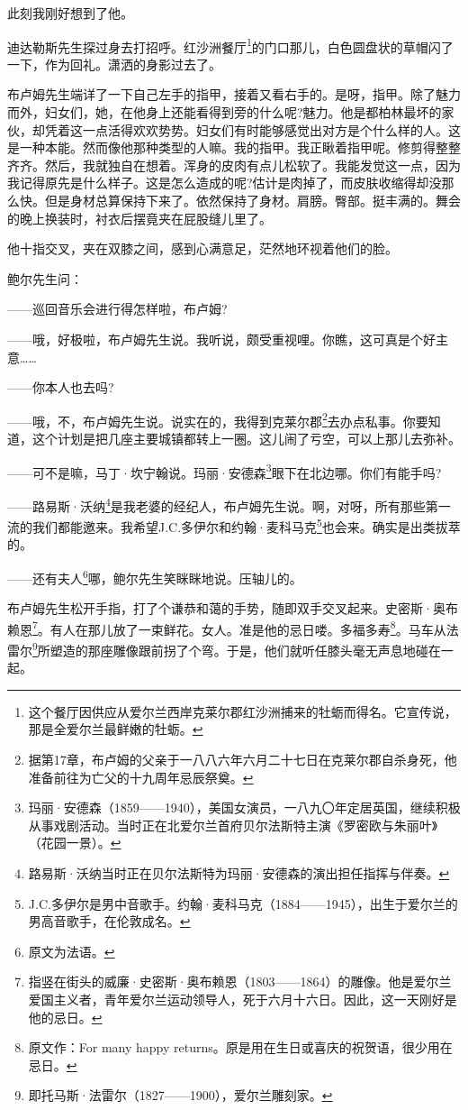 \par 此刻我刚好想到了他。
\par 迪达勒斯先生探过身去打招呼。红沙洲餐厅\footnote{这个餐厅因供应从爱尔兰西岸克莱尔郡红沙洲捕来的牡蛎而得名。它宣传说，那是全爱尔兰最鲜嫩的牡蛎。}的门口那儿，白色圆盘状的草帽闪了一下，作为回礼。潇洒的身影过去了。
\par 布卢姆先生端详了一下自己左手的指甲，接着又看右手的。是呀，指甲。除了魅力而外，妇女们，她，在他身上还能看得到旁的什么呢?魅力。他是都柏林最坏的家伙，却凭着这一点活得欢欢势势。妇女们有时能够感觉出对方是个什么样的人。这是一种本能。然而像他那种类型的人嘛。我的指甲。我正瞅着指甲呢。修剪得整整齐齐。然后，我就独自在想着。浑身的皮肉有点儿松软了。我能发觉这一点，因为我记得原先是什么样子。这是怎么造成的呢?估计是肉掉了，而皮肤收缩得却没那么快。但是身材总算保持下来了。依然保持了身材。肩膀。臀部。挺丰满的。舞会的晚上换装时，衬衣后摆竟夹在屁股缝儿里了。
\par 他十指交叉，夹在双膝之间，感到心满意足，茫然地环视着他们的脸。
\par 鲍尔先生问：
\par ——巡回音乐会进行得怎样啦，布卢姆?
\par ——哦，好极啦，布卢姆先生说。我听说，颇受重视哩。你瞧，这可真是个好主意……
\par ——你本人也去吗?
\par ——哦，不，布卢姆先生说。说实在的，我得到克莱尔郡\footnote{据第17章，布卢姆的父亲于一八八六年六月二十七日在克莱尔郡自杀身死，他准备前往为亡父的十九周年忌辰祭奠。}去办点私事。你要知道，这个计划是把几座主要城镇都转上一圈。这儿闹了亏空，可以上那儿去弥补。
\par ——可不是嘛，马丁·坎宁翰说。玛丽·安德森\footnote{玛丽·安德森（1859——1940），美国女演员，一八九〇年定居英国，继续积极从事戏剧活动。当时正在北爱尔兰首府贝尔法斯特主演《罗密欧与朱丽叶》（花园一景）。}眼下在北边哪。你们有能手吗?
\par ——路易斯·沃纳\footnote{路易斯·沃纳当时正在贝尔法斯特为玛丽·安德森的演出担任指挥与伴奏。}是我老婆的经纪人，布卢姆先生说。啊，对呀，所有那些第一流的我们都能邀来。我希望J.C.多伊尔和约翰·麦科马克\footnote{J.C.多伊尔是男中音歌手。约翰·麦科马克（1884——1945），出生于爱尔兰的男高音歌手，在伦敦成名。}也会来。确实是出类拔萃的。
\par ——还有夫人\footnote{原文为法语。}哪，鲍尔先生笑眯眯地说。压轴儿的。
\par 布卢姆先生松开手指，打了个谦恭和蔼的手势，随即双手交叉起来。史密斯·奥布赖恩\footnote{指竖在街头的威廉·史密斯·奥布赖恩（1803——1864）的雕像。他是爱尔兰爱国主义者，青年爱尔兰运动领导人，死于六月十六日。因此，这一天刚好是他的忌日。}。有人在那儿放了一束鲜花。女人。准是他的忌日喽。多福多寿\footnote{原文作：For many happy returns。原是用在生日或喜庆的祝贺语，很少用在忌日。}。马车从法雷尔\footnote{即托马斯·法雷尔（1827——1900），爱尔兰雕刻家。}所塑造的那座雕像跟前拐了个弯。于是，他们就听任膝头毫无声息地碰在一起。
